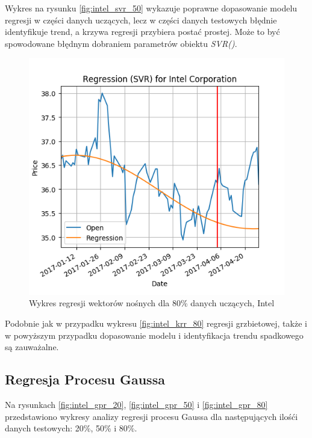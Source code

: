 Wykres na rysunku \ref{fig:intel_svr_50} wykazuje poprawne dopasowanie modelu regresji w części danych uczących, lecz w części danych testowych błędnie identyfikuje trend, a krzywa regresji przybiera postać prostej.
Może to być spowodowane błędnym dobraniem parametrów obiektu \textit{SVR()}.\\

\begin{figure}[h!]
\centering
\includegraphics[width=150mm]{pictures/plots/intel_svr_80.png}
\caption{Wykres regresji wektorów nośnych dla 80\% danych uczących, Intel}
\label{fig:intel_svr_80}
\end{figure}

Podobnie jak w przypadku wykresu \ref{fig:intel_krr_80} regresji grzbietowej, także i w powyższym przypadku dopasowanie modelu i identyfikacja trendu spadkowego są zauważalne.\\

\subsection{Regresja Procesu Gaussa}

Na rysunkach \ref{fig:intel_gpr_20}, \ref{fig:intel_gpr_50} i \ref{fig:intel_gpr_80} przedstawiono wykresy analizy regresji procesu Gaussa dla następujących ilośći danych testowych: 20\%, 50\% i 80\%.\\

